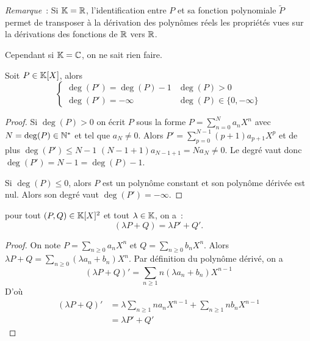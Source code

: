 \emph{Remarque}~: Si \(\mathbb{K} = \mathbb{R}\), l'identification entre \(P\) et sa fonction
polynomiale \(\widetilde{P}\) permet de transposer à la dérivation des polynômes
réels les propriétés vues sur la dérivations des fonctions de \(\mathbb{R}\) vers
\(\mathbb{R}\).

Cependant si \(\mathbb{K} = \mathbb{C}\), on ne sait rien faire.

\begin{prop}
  Soit \(P \in \mathbb{K}[X]\), alors
  \begin{equation}
    \begin{cases}
      \deg(P') = \deg(P)-1 & \deg(P)>0 \\
      \deg(P') = -\infty & \deg(P) \in \{0,-\infty\}
    \end{cases}
  \end{equation}
\end{prop}
\begin{proof}
  Si \(\deg(P)>0\) on écrit \(P\) sous la forme \(P = \sum_{n = 0}^N a_n X^n\) avec
  \(N = \deg(P) \in \mathbb{N}^*\) et tel que \(a_N \neq 0\). Alors \(P' = \sum_{p = 0}^{N-1}
  (p+1)a_{p+1} X^{p}\) et de plus \(\deg(P') \leqslant N-1\)
  \((N-1+1)a_{N-1+1} = Na_N \neq 0\). Le degré vaut donc \(\deg(P') =
  N-1 = \deg(P)-1\).

  Si \(\deg(P) \leqslant 0\), alors \(P\) est un polynôme constant et son
  polynôme dérivée est nul. Alors son degré vaut \(\deg(P') = -\infty\).
\end{proof}

\begin{prop}[Linéarité]
  pour tout \((P,Q) \in \mathbb{K}[X]^2\) et tout \(\lambda \in \mathbb{K}\), on a~:
  \begin{equation}
    (\lambda P+Q) = \lambda P'+Q'.
  \end{equation}
\end{prop}
\begin{proof}
  On note \(P = \sum_{n \geqslant 0} a_n X^n\) et \(Q = \sum_{n \geqslant 0} b_n
  X^n\). Alors \(\lambda P+Q = \sum_{n \geqslant 0} (\lambda a_n+b_n) X^n\). Par
  définition du polynôme dérivé, on a
  \begin{equation}
    (\lambda P+Q)' = \sum_{n \geqslant 1} n(\lambda a_n+b_n) X^{n-1}
  \end{equation}
  D'où
  \begin{align}
    (\lambda P+Q)' &= \lambda \sum_{n \geqslant 1} n a_n X^{n-1} + \sum_{n
    \geqslant 1} n b_n X^{n-1}\\
    & = \lambda P' +Q'
  \end{align}
\end{proof}

